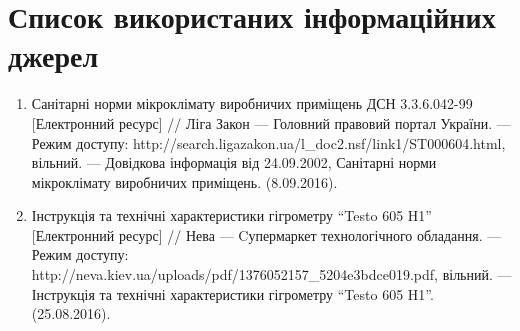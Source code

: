 \chapter*{Список використаних інформаційних джерел}
\begin{enumerate}
\item \label{src:health_standarts}Санітарні норми мікроклімату виробничих приміщень ДСН 3.3.6.042-99 [Електронний ресурс] //
  Ліга Закон --- Головний правовий портал України. --- Режим доступу:
  http://search.ligazakon.ua/l_doc2.nsf/link1/ST000604.html, вільний. --- Довідкова інформація від
  24.09.2002, Санітарні норми мікроклімату виробничих приміщень. (8.09.2016).
\item \label{src:testo_manual} Інструкція та технічні характеристики гігрометру ``Testo 605 H1'' [Електронний ресурс] // Нева
  --- Cупермаркет технологічного обладання. --- Режим доступу:
  http://neva.kiev.ua/uploads/pdf/1376052157_5204e3bdce019.pdf, вільний. --- Інструкція та технічні
  характеристики гігрометру ``Testo 605 H1''. (25.08.2016).
\end{enumerate}